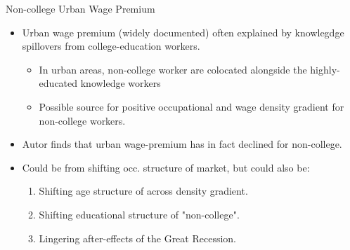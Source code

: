 \documentclass{beamer}
\begin{document}
\begin{frame}{Non-college Urban Wage Premium}

\begin{itemize}

\item Urban wage premium (widely documented) often explained by knowlegdge spillovers from college-education workers.

\begin{itemize}
	
	\item In urban areas, non-college worker are colocated alongside the highly-educated knowledge workers
	\item Possible source for positive occupational and wage density gradient for non-college workers.
	
\end{itemize}

\item Autor finds that urban wage-premium has in fact declined for non-college.

\item Could be from shifting occ. structure of market, but could also be:
\begin{enumerate}
	
	\item Shifting age structure of across density gradient.
	
	\item Shifting educational structure of "non-college".
	
	\item Lingering after-effects of the Great Recession.
	
\end{enumerate}

\end{itemize}

\end{frame}
\end{document}
